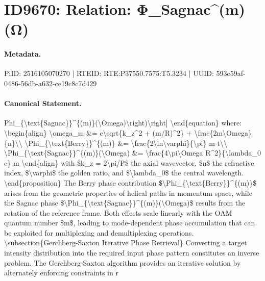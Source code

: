 \section*{ID9670: Relation: Φ\_Sagnac\textasciicircum{}(m)(Ω)}
\paragraph{Metadata.}
PiID: 2516105070270 | RTEID: RTE:P37550.7575:T5.3234 | UUID: 593c59af-0486-56db-a632-ce19c8c7d429

\paragraph{Canonical Statement.}
Phi\_\{\textbackslash{}text\{Sagnac\}\}\textasciicircum{}\{(m)\}(\textbackslash{}Omega)\textbackslash{}right)\textbackslash{}right] \textbackslash{}end\{equation\} where: \textbackslash{}begin\{align\} \textbackslash{}omega\_m \&= c\textbackslash{}sqrt\{k\_z\textasciicircum{}2 + (m/R)\textasciicircum{}2\} + \textbackslash{}frac\{2m\textbackslash{}Omega\}\{n\}\textbackslash{}\textbackslash{} \textbackslash{}Phi\_\{\textbackslash{}text\{Berry\}\}\textasciicircum{}\{(m)\} \&= \textbackslash{}frac\{2\textbackslash{}ln\textbackslash{}varphi\}\{\textbackslash{}pi\} m t\textbackslash{}\textbackslash{} \textbackslash{}Phi\_\{\textbackslash{}text\{Sagnac\}\}\textasciicircum{}\{(m)\}(\textbackslash{}Omega) \&= \textbackslash{}frac\{4\textbackslash{}pi\textbackslash{}Omega R\textasciicircum{}2\}\{\textbackslash{}lambda\_0 c\} m \textbackslash{}end\{align\} with \$k\_z = 2\textbackslash{}pi/P\$ the axial wavevector, \$n\$ the refractive index, \$\textbackslash{}varphi\$ the golden ratio, and \$\textbackslash{}lambda\_0\$ the central wavelength. \textbackslash{}end\{proposition\} The Berry phase contribution \$\textbackslash{}Phi\_\{\textbackslash{}text\{Berry\}\}\textasciicircum{}\{(m)\}\$ arises from the geometric properties of helical paths in momentum space, while the Sagnac phase \$\textbackslash{}Phi\_\{\textbackslash{}text\{Sagnac\}\}\textasciicircum{}\{(m)\}(\textbackslash{}Omega)\$ results from the rotation of the reference frame. Both effects scale linearly with the OAM quantum number \$m\$, leading to mode-dependent phase accumulation that can be exploited for multiplexing and demultiplexing operations. \textbackslash{}subsection\{Gerchberg-Saxton Iterative Phase Retrieval\} Converting a target intensity distribution into the required input phase pattern constitutes an inverse problem. The Gerchberg-Saxton algorithm provides an iterative solution by alternately enforcing constraints in r

